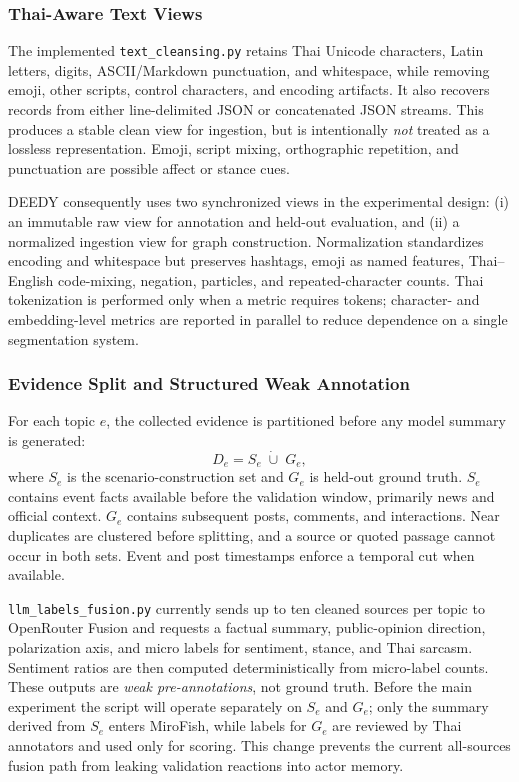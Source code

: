 \documentclass[conference]{IEEEtran}
\begin{document}
\subsubsection{Thai-Aware Text Views}

The implemented \texttt{text\_cleansing.py} retains Thai Unicode characters,
Latin letters, digits, ASCII/Markdown punctuation, and whitespace, while
removing emoji, other scripts, control characters, and encoding artifacts. It
also recovers records from either line-delimited JSON or concatenated JSON
streams. This produces a stable clean view for ingestion, but is intentionally
\emph{not} treated as a lossless representation. Emoji, script mixing,
orthographic repetition, and punctuation are possible affect or stance cues.

DEEDY consequently uses two synchronized views in the experimental design:
(i) an immutable raw view for annotation and held-out evaluation, and (ii) a
normalized ingestion view for graph construction. Normalization standardizes
encoding and whitespace but preserves hashtags, emoji as named features,
Thai--English code-mixing, negation, particles, and repeated-character counts.
Thai tokenization is performed only when a metric requires tokens; character-
and embedding-level metrics are reported in parallel to reduce dependence on a
single segmentation system.

\subsubsection{Evidence Split and Structured Weak Annotation}

For each topic $e$, the collected evidence is partitioned before any model
summary is generated:
\begin{equation}
    D_e = S_e \;\dot\cup\; G_e,
\end{equation}
where $S_e$ is the scenario-construction set and $G_e$ is held-out ground
truth. $S_e$ contains event facts available before the validation window,
primarily news and official context. $G_e$ contains subsequent posts, comments,
and interactions. Near duplicates are clustered before splitting, and a source
or quoted passage cannot occur in both sets. Event and post timestamps enforce
a temporal cut when available.

\texttt{llm\_labels\_fusion.py} currently sends up to ten cleaned sources per
topic to OpenRouter Fusion and requests a factual summary, public-opinion
direction, polarization axis, and micro labels for sentiment, stance, and Thai
sarcasm. Sentiment ratios are then computed deterministically from micro-label
counts. These outputs are \emph{weak pre-annotations}, not ground truth. Before
the main experiment the script will operate separately on $S_e$ and $G_e$;
only the summary derived from $S_e$ enters MiroFish, while labels for $G_e$ are
reviewed by Thai annotators and used only for scoring. This change prevents the
current all-sources fusion path from leaking validation reactions into actor
memory.
\end{document}
